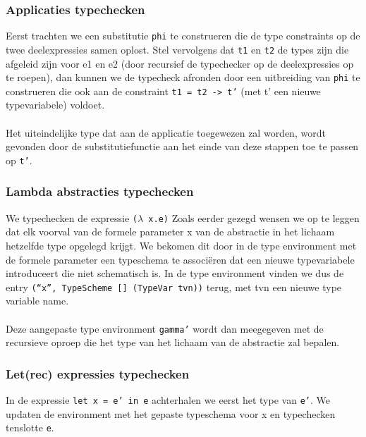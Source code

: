 \documentclass[a4paper,10pt]{article}
\begin{document}
\subsubsection{Applicaties typechecken}
Eerst trachten we een substitutie \texttt{phi} te construeren die de type constraints op de twee deelexpressies samen oplost.
Stel vervolgens dat \texttt{t1} en \texttt{t2} de types zijn die afgeleid zijn voor e1 en e2 (door recursief de typechecker op de deelexpressies op te roepen), dan kunnen we de typecheck afronden door een uitbreiding van \texttt{phi} te construeren die ook aan de constraint \texttt{t1 = t2 -> t'} (met t' een nieuwe typevariabele) voldoet.
\paragraph{}
Het uiteindelijke type dat aan de applicatie toegewezen zal worden, wordt gevonden door de substitutiefunctie aan het einde van deze stappen toe te passen op \texttt{t'}.

\subsubsection{Lambda abstracties typechecken}
We typechecken de expressie \texttt{($\lambda$ x.e)}
Zoals eerder gezegd wensen we op te leggen dat elk voorval van de formele parameter x van de abstractie in het lichaam hetzelfde type opgelegd krijgt.
We bekomen dit door in de type environment met de formele parameter een typeschema te associ{\"e}ren dat een nieuwe typevariabele introduceert die niet schematisch is.
In de type environment vinden we dus de entry \texttt{(``x'', TypeScheme [] (TypeVar tvn))} terug, met tvn een nieuwe type variable name.
\paragraph{}
Deze aangepaste type environment \texttt{gamma'} wordt dan meegegeven met de recursieve oproep die het type van het lichaam van de abstractie zal bepalen.

\subsubsection{Let(rec) expressies typechecken}
In de expressie \texttt{let x = e' in e} achterhalen we eerst het type van \texttt{e'}.
We updaten de environment met het gepaste typeschema voor x en typechecken tenslotte \texttt{e}.
\end{document}
